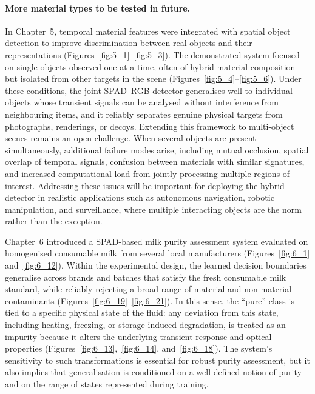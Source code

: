 \documentclass[12pt,a4paper,oneside]{report}
\begin{document}
\paragraph{More material types to be tested in future.}
In Chapter~5, temporal material features were integrated with spatial object detection to improve discrimination between real objects and their representations (Figures~\ref{fig:5_1}--\ref{fig:5_3}). The demonstrated system focused on single objects observed one at a time, often of hybrid material composition but isolated from other targets in the scene (Figures~\ref{fig:5_4}--\ref{fig:5_6}). Under these conditions, the joint SPAD--RGB detector generalises well to individual objects whose transient signals can be analysed without interference from neighbouring items, and it reliably separates genuine physical targets from photographs, renderings, or decoys. Extending this framework to multi-object scenes remains an open challenge. When several objects are present simultaneously, additional failure modes arise, including mutual occlusion, spatial overlap of temporal signals, confusion between materials with similar signatures, and increased computational load from jointly processing multiple regions of interest. Addressing these issues will be important for deploying the hybrid detector in realistic applications such as autonomous navigation, robotic manipulation, and surveillance, where multiple interacting objects are the norm rather than the exception.

Chapter~6 introduced a SPAD-based milk purity assessment system evaluated on homogenised consumable milk from several local manufacturers (Figures~\ref{fig:6_1} and~\ref{fig:6_12}). Within the experimental design, the learned decision boundaries generalise across brands and batches that satisfy the fresh consumable milk standard, while reliably rejecting a broad range of material and non-material contaminants (Figures~\ref{fig:6_19}--\ref{fig:6_21}). In this sense, the ``pure'' class is tied to a specific physical state of the fluid: any deviation from this state, including heating, freezing, or storage-induced degradation, is treated as an impurity because it alters the underlying transient response and optical properties (Figures~\ref{fig:6_13},~\ref{fig:6_14}, and~\ref{fig:6_18}). The system's sensitivity to such transformations is essential for robust purity assessment, but it also implies that generalisation is conditioned on a well-defined notion of purity and on the range of states represented during training.
\end{document}
